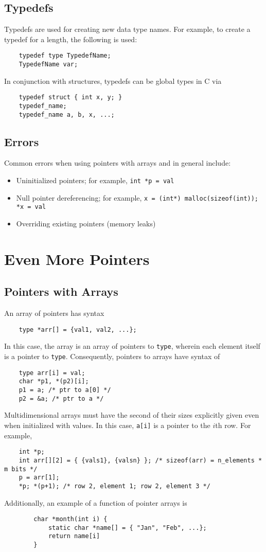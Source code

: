 \documentclass{tufte-book}
\begin{document}
\begin{fullwidth}
\section{Typedefs}
Typedefs are used for creating new data type names. For example, to create a typedef for a length, the following is used:
\begin{lstlisting}
    typedef type TypedefName;
    TypedefName var;
\end{lstlisting}
In conjunction with structures, typedefs can be global types in C via
\begin{lstlisting}
    typedef struct { int x, y; }
    typedef_name;
    typedef_name a, b, x, ...;
\end{lstlisting}

\section{Errors}
Common errors when using pointers with arrays and in general include:
\begin{itemize}
    \item Uninitialized pointers; for example, \lstinline{int *p = val}
    \item Null pointer dereferencing; for example, \lstinline{x = (int*) malloc(sizeof(int)); *x = val}
    \item Overriding existing pointers (memory leaks)
\end{itemize}

\chapter{Even More Pointers}
\section{Pointers with Arrays}
An array of pointers has syntax
\begin{lstlisting}
    type *arr[] = {val1, val2, ...};
\end{lstlisting}
In this case, the array is an array of pointers to \lstinline{type}, wherein each element itself is a pointer to \lstinline{type}. Consequently, pointers to arrays have syntax of
\begin{lstlisting}
    type arr[i] = val;
    char *p1, *(p2)[i];
    p1 = a; /* ptr to a[0] */
    p2 = &a; /* ptr to a */
\end{lstlisting}
Multidimensional arrays must have the second of their sizes explicitly given even when initialized with values. In this case, \lstinline{a[i]} is a pointer to the $i$th row. For example,
\begin{lstlisting}
    int *p;
    int arr[][2] = { {vals1}, {valsn} }; /* sizeof(arr) = n_elements * m bits */
    p = arr[1];
    *p; *(p+1); /* row 2, element 1; row 2, element 3 */
\end{lstlisting}
Additionally, an example of a function of pointer arrays is
\begin{lstlisting}
        char *month(int i) {
            static char *name[] = { "Jan", "Feb", ...};
            return name[i]
        }
\end{lstlisting}


\end{fullwidth}
\end{document}
